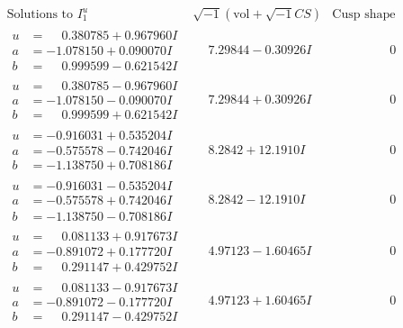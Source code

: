 \documentclass[1p]{elsarticle_modified}
\theoremstyle{definition}
\newcommand{\I}{\sqrt{-1}}
\begin{document}
$$\begin{array}{c|c|c}  
\text{Solutions to }I^u_{1}& \I (\text{vol} + \sqrt{-1}CS) & \text{Cusp shape}\\
 \hline 
\begin{aligned}
u &= \phantom{-}0.380785 + 0.967960 I \\
a &= -1.078150 + 0.090070 I \\
b &= \phantom{-}0.999599 - 0.621542 I\end{aligned}
 & \phantom{-}7.29844 - 0.30926 I & \phantom{-0.000000 } 0 \\ \hline\begin{aligned}
u &= \phantom{-}0.380785 - 0.967960 I \\
a &= -1.078150 - 0.090070 I \\
b &= \phantom{-}0.999599 + 0.621542 I\end{aligned}
 & \phantom{-}7.29844 + 0.30926 I & \phantom{-0.000000 } 0 \\ \hline\begin{aligned}
u &= -0.916031 + 0.535204 I \\
a &= -0.575578 - 0.742046 I \\
b &= -1.138750 + 0.708186 I\end{aligned}
 & \phantom{-}8.2842 + 12.1910 I & \phantom{-0.000000 } 0 \\ \hline\begin{aligned}
u &= -0.916031 - 0.535204 I \\
a &= -0.575578 + 0.742046 I \\
b &= -1.138750 - 0.708186 I\end{aligned}
 & \phantom{-}8.2842 - 12.1910 I & \phantom{-0.000000 } 0 \\ \hline\begin{aligned}
u &= \phantom{-}0.081133 + 0.917673 I \\
a &= -0.891072 + 0.177720 I \\
b &= \phantom{-}0.291147 + 0.429752 I\end{aligned}
 & \phantom{-}4.97123 - 1.60465 I & \phantom{-0.000000 } 0 \\ \hline\begin{aligned}
u &= \phantom{-}0.081133 - 0.917673 I \\
a &= -0.891072 - 0.177720 I \\
b &= \phantom{-}0.291147 - 0.429752 I\end{aligned}
 & \phantom{-}4.97123 + 1.60465 I & \phantom{-0.000000 } 0 \\ \hline\begin{aligned}

\end{aligned}
\end{array}$$
\end{document}
